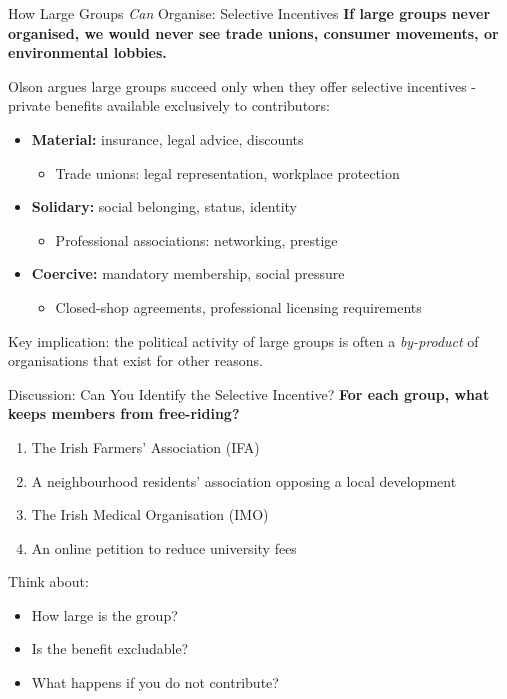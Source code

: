 \documentclass[10pt]{beamer}
\begin{document}
\begin{frame}{How Large Groups \emph{Can} Organise: Selective Incentives}
\textbf{If large groups never organised, we would never see trade unions, consumer movements, or environmental lobbies.}

\vspace{0.1cm}
Olson argues large groups succeed only when they offer \alert{selective incentives} - private benefits available exclusively to contributors:

\vspace{0.1cm}
\begin{itemize}
\item \textbf{Material:} insurance, legal advice, discounts
\begin{itemize}
\item[\footnotesize$\triangleright$] \footnotesize Trade unions: legal representation, workplace protection
\end{itemize}
\item \textbf{Solidary:} social belonging, status, identity
\begin{itemize}
\item[\footnotesize$\triangleright$] \footnotesize Professional associations: networking, prestige
\end{itemize}
\item \textbf{Coercive:} mandatory membership, social pressure
\begin{itemize}
\item[\footnotesize$\triangleright$] \footnotesize Closed-shop agreements, professional licensing requirements
\end{itemize}
\end{itemize}

\vspace{0.1cm}
\alert{Key implication:} the political activity of large groups is often a \emph{by-product} of organisations that exist for other reasons.
\end{frame}


\begin{frame}{Discussion: Can You Identify the Selective Incentive?}
\textbf{For each group, what keeps members from free-riding?}

\vspace{0.1cm}
\begin{enumerate}
\item The Irish Farmers' Association (IFA)
\item A neighbourhood residents' association opposing a local development
\item The Irish Medical Organisation (IMO)
\item An online petition to reduce university fees
\end{enumerate}

\vspace{0.2cm}
\alert{Think about:}
\begin{itemize}
\item How large is the group?
\item Is the benefit excludable?
\item What happens if you do not contribute?
\end{itemize}
\end{frame}
\end{document}
